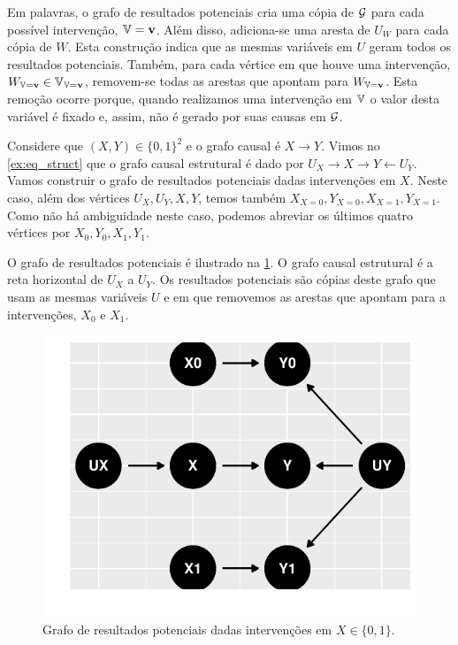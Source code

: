 Em palavras, o grafo de resultados potenciais cria 
uma cópia de ${\mathcal G}$ para cada possível intervenção, ${\mathbb V}={\mathbf{v}}$.
Além disso, adiciona-se uma aresta de $U_W$ para cada cópia de $W$.
Esta construção indica que as mesmas variáveis em $U$
geram todos os resultados potenciais.
Também, para cada vértice em que 
houve uma intervenção,
$W_{{\mathbb V}={\mathbf{v}}} \in {\mathbb V}_{{\mathbb V}={\mathbf{v}}}$, removem-se 
todas as arestas que apontam para $W_{{\mathbb V}={\mathbf{v}}}$.
Esta remoção ocorre porque, 
quando realizamos uma intervenção em ${\mathbb V}$
o valor desta variável é fixado e, assim,
não é gerado por suas causas em ${\mathcal G}$.

\begin{example}
 \label{ex:grafo_potencial}
 Considere que $(X,Y) \in \{0,1\}^2$ e 
 o grafo causal é $X \rightarrow Y$.
 Vimos no \cref{ex:eq_struct} que 
 o grafo causal estrutural é dado por
 $U_X \rightarrow X \rightarrow Y \leftarrow U_Y$.
 Vamos construir o grafo de resultados potenciais
 dadas intervenções em $X$.
 Neste caso, além dos vértices $U_X, U_Y, X, Y$,
 temos também $X_{X=0}, Y_{X=0}, X_{X=1}, Y_{X=1}$.
 Como não há ambiguidade neste caso, 
 podemos abreviar os últimos quatro vértices por
 $X_0, Y_0, X_1, Y_1$.
 
 O grafo de resultados potenciais é
 ilustrado na \cref{fig:grafo_potencial}.
 O grafo causal estrutural é a reta horizontal 
 de $U_X$ a $U_Y$. 
 Os resultados potenciais são 
 cópias deste grafo que usam 
 as mesmas variáveis $U$ e 
 em que removemos as arestas que
 apontam para a intervenções, $X_0$ e $X_1$.
 
\begin{knitrout}
\color{fgcolor}\begin{figure}[t]

{\centering \includegraphics[width=\maxwidth]{./figures/grafo_potencial-1} 

}

\caption[Grafo de resultados potenciais dadas intervenções em $X \in \{0,1\}$]{Grafo de resultados potenciais dadas intervenções em $X \in \{0,1\}$.}\label{fig:grafo_potencial}
\end{figure}

\end{knitrout}
\end{example}

